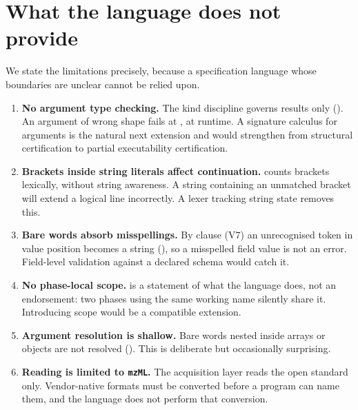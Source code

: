\documentclass[11pt,twocolumn,a4paper]{article}
\theoremstyle{ssthm}
\theoremstyle{definition}
\theoremstyle{remark}
\newcommand{\shk}[1]{\texttt{#1}}
\begin{document}
\section{What the language does not provide}
\label{sec:limits}

We state the limitations precisely, because a specification language
whose boundaries are unclear cannot be relied upon.

\begin{enumerate}[label=\textbf{L\arabic*.},leftmargin=2.8em,itemsep=4pt]

\item \textbf{No argument type checking.} The kind discipline governs
      results only (). An argument of wrong shape
      fails at , at runtime. A signature calculus for
      arguments is the natural next extension and would strengthen
       from structural certification to
      partial executability certification.

\item \textbf{Brackets inside string literals affect continuation.}
       counts brackets lexically, without string
      awareness. A string containing an unmatched bracket will extend a
      logical line incorrectly. A lexer tracking string state removes
      this.

\item \textbf{Bare words absorb misspellings.} By clause (V7) an
      unrecognised token in value position becomes a string
      (), so a misspelled field value is not an error.
      Field-level validation against a declared schema would catch it.

\item \textbf{No phase-local scope.}  is a
      statement of what the language does, not an endorsement: two
      phases using the same working name silently share it. Introducing
      scope would be a compatible extension.

\item \textbf{Argument resolution is shallow.} Bare words nested inside
      arrays or objects are not resolved (). This
      is deliberate but occasionally surprising.

\item \textbf{Reading is limited to \shk{mzML}.} The acquisition layer
      reads the open standard \citep{martens2011mzml,deutsch2008mzml}
      only. Vendor-native formats must be converted before a program can
      name them, and the language does not perform that conversion.


\end{enumerate}
\end{document}
